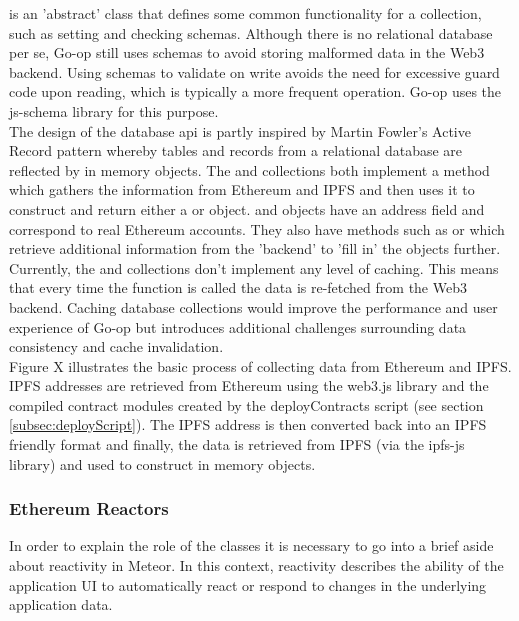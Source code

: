  is an 'abstract' class that defines some common functionality for a collection, such as setting and checking schemas. Although there is no relational database per se, Go-op still uses schemas to avoid storing malformed data in the Web3 backend. Using schemas to validate on write avoids the need for excessive guard code upon reading, which is typically a more frequent operation.  Go-op uses the js-schema\cite{jsSchema} library for this purpose.\\

The design of the database api is partly inspired by Martin Fowler's Active Record pattern\cite{ActiveRecord} whereby tables and records from a relational database are reflected by in memory objects. The  and  collections both implement a  method which gathers the information from Ethereum and IPFS and then uses it to construct and return either a  or  object.  and  objects have an address field and correspond to real Ethereum accounts. They also have methods such as  or  which retrieve additional information from the 'backend' to 'fill in' the objects further.\\

Currently, the  and  collections don't implement any level of caching. This means that every time the  function is called the data is re-fetched from the Web3 backend. Caching database collections would improve the performance and user experience of Go-op but introduces additional challenges surrounding data consistency and cache invalidation.\\

Figure X illustrates the basic process of collecting data from Ethereum and IPFS. IPFS addresses are retrieved from Ethereum using the web3.js library and the compiled contract modules created by the deployContracts script (see section \ref{subsec:deployScript}). The IPFS address is then converted back into an IPFS friendly format and finally, the data is retrieved from IPFS (via the ipfs-js library) and used to construct in memory objects.\\

\subsubsection{Ethereum Reactors}
In order to explain the role of the  classes it is necessary to go into a brief aside about reactivity in Meteor. In this context, reactivity describes the ability of the application UI to automatically react or respond to changes in the underlying application data.\\


